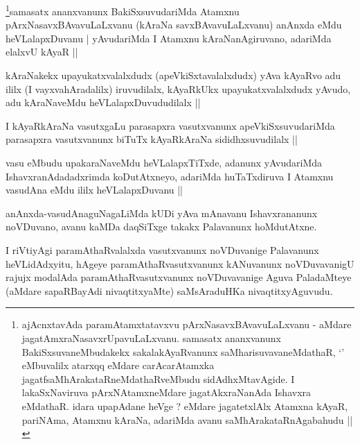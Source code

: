 \begin{artha}
\footnote{ajAcnxtavAda paramAtamxtatavxvu pArxNasavxBAvavuLaLxvanu - aMdare jagatAmxraNasavxrUpavuLaLxvanu. samasatx ananxvanunx BakiSxsuvaneMbudakekx sakalakAyaRvanunx saMharisuvavaneMdathaR, `\stext' eMbuvalilx atarxqq eMdare carAcarAtamxka jagatfsaMhArakataRneMdathaRveMbudu sidAdhxMtavAgide. I lakaSxNaviruva pArxNAtamxneMdare jagatAkxraNanAda Ishavxra eMdathaR. idara upapAdane heVge ? eMdare jagatetxlAlx Atamxna kAyaR, pariNAma, Atamxnu kAraNa, adariMda avanu saMhArakataRnAgabahudu ||}samasatx ananxvanunx BakiSxsuvudariMda Atamxnu pArxNasavxBAvavuLaLxvanu (kAraNa savxBAvavuLaLxvanu) anAnxda eMdu heVLalapxDuvanu | yAvudariMda I Atamxnu kAraNanAgiruvano, adariMda elalxvU kAyaR ||
\end{artha}

\begin{artha}
kAraNakekx upayukatxvalalxdudx (apeVkiSxtavalalxdudx) yAva kAyaRvo adu ililx (I vayxvahAradalilx) iruvudilalx, kAyaRkUkx upayukatxvalalxdudx yAvudo, adu kAraNaveMdu heVLalapxDuvududilalx ||
\end{artha}


\begin{artha}
I kAyaRkAraNa vasutxgaLu parasapxra vasutxvanunx apeVkiSxsuvudariMda parasapxra vasutxvanunx biTuTx kAyaRkAraNa sididhxsuvudilalx ||
\end{artha}

\begin{artha}
vasu eMbudu upakaraNaveMdu heVLalapxTiTxde, adanunx yAvudariMda IshavxranAdadadxrimda koDutAtxneyo, adariMda huTaTxdiruva I Atamxnu vasudAna eMdu ililx heVLalapxDuvanu ||
\end{artha}

\begin{artha}
anAnxda-vasudAnaguNagaLiMda kUDi yAva mAnavanu Ishavxrananunx noVDuvano, avanu kaMDa daqSiTxge takakx Palavanunx hoMdutAtxne. 
\end{artha}

\begin{artha}
  I riVtiyAgi paramAthaRvalalxda vasutxvanunx noVDuvanige Palavanunx heVLidAdxyitu, hAgeye paramAthaRvasutxvanunx kANuvanunx noVDuvavanigU rajujx modalAda paramAthaRvasutxvanunx noVDuvavanige Aguva PaladaMteye (aMdare sapaRBayAdi nivaqtitxyaMte) saMsAraduHKa nivaqtitxyAguvudu. 
\end{artha}


